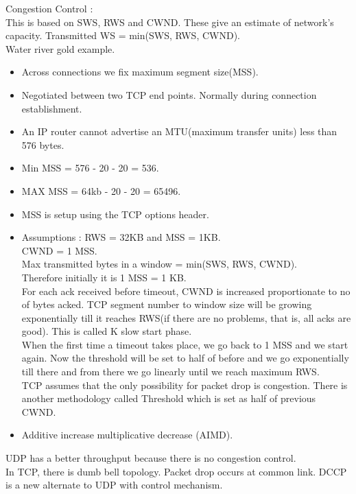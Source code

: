 \documentclass[solution,addpoints,12pt]{exam}
\begin{document}
Congestion Control :\\
This is based on SWS, RWS and CWND. These give an estimate of network's
capacity. Transmitted WS = min(SWS, RWS, CWND).\\
Water river gold example.\\
\begin{itemize}
\item Across connections we fix maximum segment size(MSS).
\item Negotiated between two TCP end points. Normally
during connection establishment.
\item An IP router cannot advertise an MTU(maximum transfer units)
less than 576 bytes.
\item Min MSS = 576 - 20 - 20 = 536.
\item MAX MSS = 64kb - 20 - 20 = 65496.
\item MSS is setup using the TCP options header.
\item Assumptions : RWS = 32KB and MSS = 1KB.\\
CWND = 1 MSS.\\
Max transmitted bytes in a window = min(SWS, RWS, CWND).\\
Therefore initially it is 1 MSS = 1 KB.\\

For each ack received before timeout, CWND is increased proportionate to no of
bytes acked. TCP segment number to window size
will be growing exponentially till it reaches RWS(if there are no
problems, that is, all acks are good). This is called K slow start phase.\\

When the first time a timeout takes place, we go back to 1 MSS
and we start again. Now the threshold will be set to half of before
and we go exponentially till there and from there we go linearly until
we reach maximum RWS.\\

TCP assumes that the only possibility
for packet drop is congestion. There is another methodology
called Threshold which is set as half of previous CWND.\\

\item Additive increase multiplicative decrease (AIMD).
\end{itemize}

UDP has a better throughput because there is no congestion control.\\
In TCP, there is dumb bell topology. Packet drop occurs
at common link. DCCP is a new alternate to UDP with control
mechanism.\\
\end{document}
